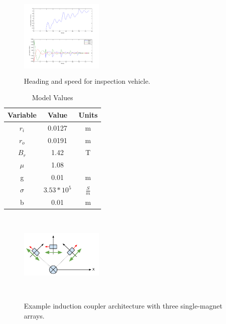 \begin{figure}

\includegraphics[width = 4cm, height = 4cm ]{figures/theta_and_speed.png}
\caption{Heading and speed for inspection vehicle.}
\label{fig:theta_and_speeds}
\end{figure}



\begin{table}[ht]
\caption{Model Values} %
\centering %
\begin{tabular}{c c c} %
\hline\hline %
Variable & Value & Units\\ [0.5ex] %
\hline

$r_i$ & 0.0127 & m\\  
$r_o$ & 0.0191 & m \\
$B_r$ & 1.42 & T \\
$\mu$ & 1.08 & \\
g & 0.01 & m\\

$\sigma$ & $3.53 * 10^5$ & $\frac{S}{m}$ \\
b & 0.01 & m

 \\ [1ex] %
\hline %
\end{tabular}
\label{table:values} %
\end{table}


\begin{figure}
\includegraphics[width = 4cm, height = 4cm ]{figures/sample_coupler.png}
\label{fig:sample_coupler}
\caption{Example induction coupler architecture with three single-magnet arrays.}
\end{figure}